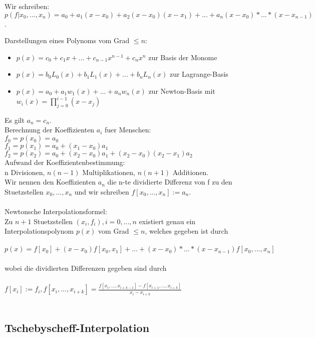 \documentclass[a4paper]{scrreprt}
\begin{document}
Wir schreiben:\\
$p(f|x_0,...,x_n) = a_0 + a_1(x - x_0) + a_2(x - x_0)(x - x_1) + ... + a_n(x - x_0)*...*(x - x_{n-1})$.

Darstellungen eines Polynoms vom Grad $\leq n$:
\begin{itemize}
	\item $p(x) = c_0 + c_1x + ... + c_{n-1}x^{n-1} + c_nx^n$ zur Basis der Monome
	\item $p(x) = b_0L_0(x) + b_1L_1(x) + ... + b_nL_n(x)$ zur Lagrange-Basis
	\item $p(x) = a_0 + a_1w_1(x) + ... + a_nw_n(x)$ zur Newton-Basis mit $w_i(x) = \prod_{j=0}^{i-1}(x - x_j)$
\end{itemize}

Es gilt $a_n = c_n$.\\

Berechnung der Koeffizienten $a_i$ fuer Menschen:\\
$f_0 = p(x_0) = a_0$\\
$f_1 = p(x_1) = a_0 + (x_1 - x_0)a_1$\\
$f_2 = p(x_2) = a_0 + (x_2 - x_0)a_1 + (x_2 - x_0)(x_2 - x_1)a_2$\\

Aufwand der Koeffizientenbestimmung:\\
n Divisionen, $n(n-1)$ Multiplikationen, $n(n+1)$ Additionen.\\

Wir nennen den Koeffizienten $a_n$ die n-te dividierte Differenz von f zu den Stuetzstellen $x_0,...,x_n$ und wir schreiben $f[x_0,...,x_n] := a_n$.\\\\

Newtonsche Interpolationsformel:\\
Zu $n+1$ Stuetzstellen $(x_i,f_i), i=0,...,n$ existiert genau ein Interpolationspolynom $p(x)$ vom Grad $\leq n$, welches gegeben ist durch\\\\
$p(x) = f[x_0] + (x-x_0)f[x_0,x_1] + ...+ (x-x_0)*...*(x-x_{n-1})f[x_0,...,x_n]$\\\\wobei die dividierten Differenzen gegeben sind durch\\\\
$f[x_i]:=f_i, f[x_i,...,x_{i+k}] = \frac{f[x_i,...,x_{i+k-1}]-f[x_{i+1},...,x_{i+k}]}{x_i - x_{i+k}}$\\\\

\subsection{Tschebyscheff-Interpolation}
\end{document}
